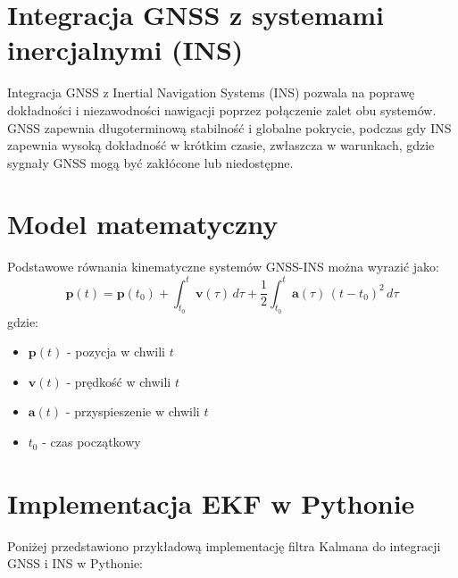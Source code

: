 \section{Integracja GNSS z systemami inercjalnymi (INS)}

Integracja GNSS z Inertial Navigation Systems (INS) pozwala na poprawę dokładności i niezawodności nawigacji poprzez połączenie zalet obu systemów. GNSS zapewnia długoterminową stabilność i globalne pokrycie, podczas gdy INS zapewnia wysoką dokładność w krótkim czasie, zwłaszcza w warunkach, gdzie sygnały GNSS mogą być zakłócone lub niedostępne.

\section{Model matematyczny}
Podstawowe równania kinematyczne systemów GNSS-INS można wyrazić jako:
\[
\mathbf{p}(t) = \mathbf{p}(t_0) + \int_{t_0}^{t} \mathbf{v}(\tau) \, d\tau + \frac{1}{2} \int_{t_0}^{t} \mathbf{a}(\tau) \, (t - t_0)^2 \, d\tau
\]
gdzie:
\begin{itemize}
    \item $\mathbf{p}(t)$ - pozycja w chwili $t$
    \item $\mathbf{v}(t)$ - prędkość w chwili $t$
    \item $\mathbf{a}(t)$ - przyspieszenie w chwili $t$
    \item $t_0$ - czas początkowy
\end{itemize}

\section{Implementacja EKF w Pythonie}
Poniżej przedstawiono przykładową implementację filtra Kalmana do integracji GNSS i INS w Pythonie:


